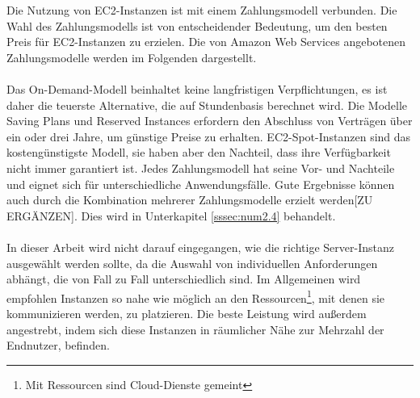 Die Nutzung von EC2-Instanzen ist mit einem Zahlungsmodell verbunden. Die Wahl des Zahlungsmodells ist von entscheidender Bedeutung, um den besten Preis für EC2-Instanzen zu erzielen.
Die von Amazon Web Services angebotenen Zahlungsmodelle werden im Folgenden dargestellt.
\\\\
Das On-Demand-Modell beinhaltet keine langfristigen Verpflichtungen, es ist daher die teuerste Alternative, die auf Stundenbasis berechnet wird. Die Modelle Saving Plans und Reserved Instances erfordern den Abschluss von Verträgen über ein oder drei Jahre, um günstige Preise zu erhalten. EC2-Spot-Instanzen sind das kostengünstigste Modell, sie haben aber den Nachteil, dass ihre Verfügbarkeit nicht immer garantiert ist. Jedes Zahlungsmodell hat seine Vor- und Nachteile und eignet sich für unterschiedliche Anwendungsfälle. Gute Ergebnisse können auch durch die Kombination mehrerer Zahlungsmodelle erzielt werden[ZU ERGÄNZEN]. %
Dies wird in Unterkapitel \ref{sssec:num2.4} behandelt.
\\\\
In dieser Arbeit wird nicht darauf eingegangen, wie die richtige Server-Instanz ausgewählt werden sollte, da die Auswahl von individuellen Anforderungen abhängt, die von Fall zu Fall unterschiedlich sind. Im Allgemeinen wird empfohlen Instanzen so nahe wie möglich an den Ressourcen\footnote{Mit Ressourcen sind Cloud-Dienste gemeint}, mit denen sie kommunizieren werden, zu platzieren. %
Die beste Leistung wird außerdem angestrebt, indem sich diese Instanzen in räumlicher Nähe zur Mehrzahl der Endnutzer, befinden. 
